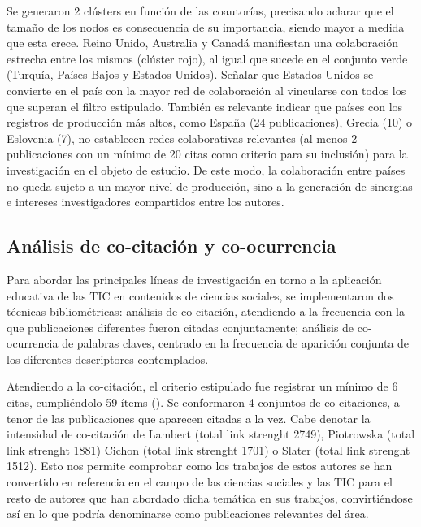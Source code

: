 \documentclass[spanish]{textolivre}
\begin{document}
Se generaron 2 clústers en función de las coautorías, precisando aclarar que el tamaño de los nodos es consecuencia de su importancia, siendo mayor a medida que esta crece. Reino Unido, Australia y Canadá manifiestan una colaboración estrecha entre los mismos (clúster rojo), al igual que sucede en el conjunto verde (Turquía, Países Bajos y Estados Unidos). Señalar que Estados Unidos se convierte en el país con la mayor red de colaboración al vincularse con todos los que superan el filtro estipulado. También es relevante indicar que países con los registros de producción más altos, como España (24 publicaciones), Grecia (10) o Eslovenia (7), no establecen redes colaborativas relevantes (al menos 2 publicaciones con un mínimo de 20 citas como criterio para su inclusión) para la investigación en el objeto de estudio. De este modo, la colaboración entre países no queda sujeto a un mayor nivel de producción, sino a la generación de sinergias e intereses investigadores compartidos entre los autores. 



\subsection{Análisis de co-citación y co-ocurrencia}

Para abordar las principales líneas de investigación en torno a la aplicación educativa de las TIC en contenidos de ciencias sociales, se implementaron dos técnicas bibliométricas: análisis de co-citación, atendiendo a la frecuencia con la que publicaciones diferentes fueron citadas conjuntamente; análisis de co-ocurrencia de palabras claves, centrado en la frecuencia de aparición conjunta de los diferentes descriptores contemplados. 

Atendiendo a la co-citación, el criterio estipulado fue registrar un mínimo de 6 citas, cumpliéndolo 59 ítems (). Se conformaron 4 conjuntos de co-citaciones, a tenor de las publicaciones que aparecen citadas a la vez. Cabe denotar la intensidad de co-citación de Lambert (total link strenght 2749), Piotrowska (total link strenght 1881) Cichon (total link strenght 1701) o Slater (total link strenght 1512). Esto nos permite comprobar como los trabajos de estos autores se han convertido en referencia en el campo de las ciencias sociales y las TIC para el resto de autores que han abordado dicha temática en sus trabajos, convirtiéndose así en lo que podría denominarse como publicaciones relevantes del área.
\end{document}
